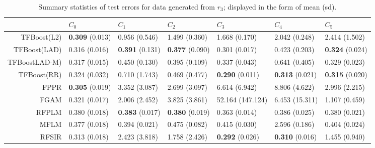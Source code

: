 \begin{table}[H]
\footnotesize
\centering
\begin{tabular}{rllllll}
  \hline
 & $C_0$ & $C_1$ & $C_2$ & $C_3$ & $C_4$ & $C_5$ \\ 
  \hline
TFBoost(L2) & \textbf{0.309} (0.013) & 0.956 (0.546) & 1.499 (0.360) & 1.668 (0.170) & 2.042 (0.248) & 2.414 (1.502) \\ 
  TFBoost(LAD) & 0.316 (0.016) & \textbf{0.391} (0.131) & \textbf{0.377} (0.090) & 0.301 (0.017) & 0.423 (0.203) & \textbf{0.324} (0.024) \\ 
  TFBoostLAD-M) & 0.317 (0.015) & 0.450 (0.130) & 0.395 (0.109) & 0.337 (0.043) & 0.641 (0.405) & 0.329 (0.023) \\ 
  TFBoost(RR) & 0.324 (0.032) & 0.710 (1.743) & 0.469 (0.477) & \textbf{0.290} (0.011) & \textbf{0.313} (0.021) & \textbf{0.315} (0.020) \\ 
  FPPR & \textbf{0.305} (0.019) & 3.352 (3.087) & 2.699 (3.097) & 6.614 (6.942) & 8.806 (4.622) & 2.996 (2.215) \\ 
  FGAM & 0.321 (0.017) & 2.006 (2.452) & 3.825 (3.861) & 52.164 (147.124) & 6.453 (15.311) & 1.107 (0.459) \\ 
  RFPLM & 0.380 (0.018) & \textbf{0.383} (0.017) & \textbf{0.380} (0.019) & 0.363 (0.014) & 0.386 (0.025) & 0.380 (0.021) \\ 
  MFLM & 0.377 (0.018) & 0.394 (0.021) & 0.475 (0.082) & 0.415 (0.030) & 2.596 (0.186) & 0.404 (0.024) \\ 
  RFSIR & 0.313 (0.018) & 2.423 (3.818) & 1.758 (2.426) & \textbf{0.292} (0.026) & \textbf{0.310} (0.016) & 1.455 (0.940) \\ 
   \hline
\end{tabular}
\caption{Summary statistics of test errors for data generated from $r_3$; displayed in the form of mean (sd).} 
\end{table}
